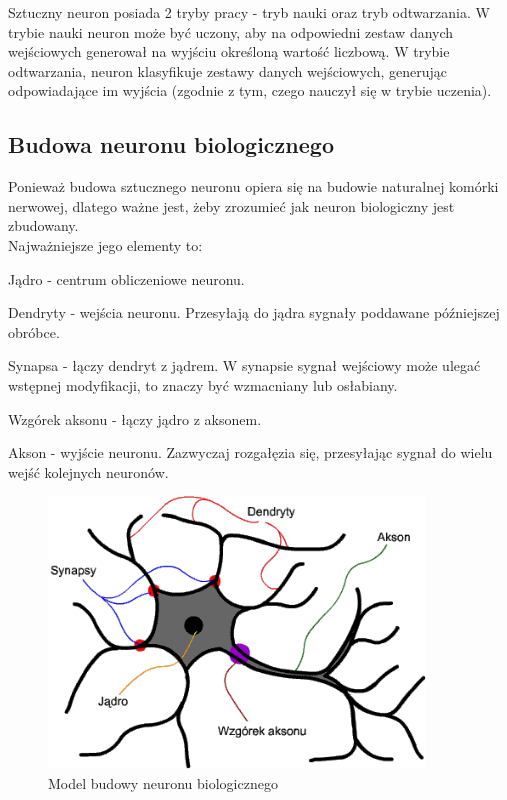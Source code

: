 Sztuczny neuron posiada 2 tryby pracy - tryb nauki oraz tryb odtwarzania. \newline
W trybie nauki neuron może być uczony, aby na odpowiedni zestaw danych
wejściowych generował na wyjściu określoną wartość liczbową. \newline
W trybie odtwarzania, neuron klasyfikuje zestawy danych wejściowych, generując
odpowiadające im wyjścia (zgodnie z tym, czego nauczył się w trybie uczenia).

\subsection{Budowa neuronu biologicznego}
Ponieważ budowa sztucznego neuronu opiera się na budowie naturalnej komórki nerwowej, dlatego ważne jest, żeby zrozumieć jak neuron biologiczny jest zbudowany. \\
Najważniejsze jego elementy to:
\begin{itemize*}
\item Jądro - centrum obliczeniowe neuronu.
\item Dendryty - wejścia neuronu. Przesyłają do jądra sygnały poddawane późniejszej obróbce.
\item Synapsa - łączy dendryt z jądrem. W synapsie sygnał wejściowy może ulegać wstępnej modyfikacji, to znaczy być wzmacniany lub osłabiany.
\item Wzgórek aksonu - łączy jądro z aksonem.
\item Akson - wyjście neuronu. Zazwyczaj rozgałęzia się, przesyłając sygnał do wielu wejść kolejnych neuronów.
\end{itemize*}

\begin{figure}[h]
\begin{center}
\includegraphics[width=10cm]{resources/figures/natural_neuron.png}
\caption{Model budowy neuronu biologicznego}
\end{center}
\end{figure}
\label{NaturalNeuronRys}

